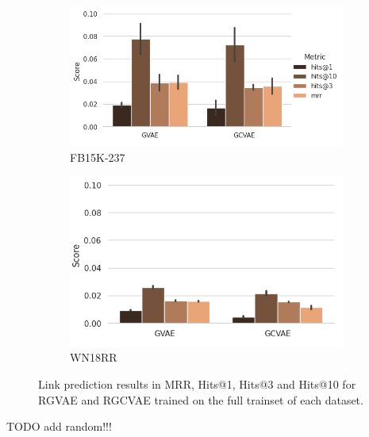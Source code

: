  \begin{figure}[H]
  \centering
  \begin{subfigure}{.5\textwidth}
    \left
    \includegraphics[height=.5\textwidth, keepaspectratio]{graphs/plots/lp_fb.png}
    \caption{FB15K-237}
    \label{fig5:lpfb}
  \end{subfigure}%
  \begin{subfigure}{.5\textwidth}
    \right
    \includegraphics[height=.5\textwidth]{graphs/plots/lp_wn_wol.png}
    \caption{WN18RR}
    \label{fig5:lpwn}
  \end{subfigure}
  \caption{Link prediction results in MRR, Hits@1, Hits@3 and Hits@10 for RGVAE and RGCVAE trained on the full trainset of each dataset.}
  \label{fig5:lp_final}
\end{figure}

TODO add random!!!






